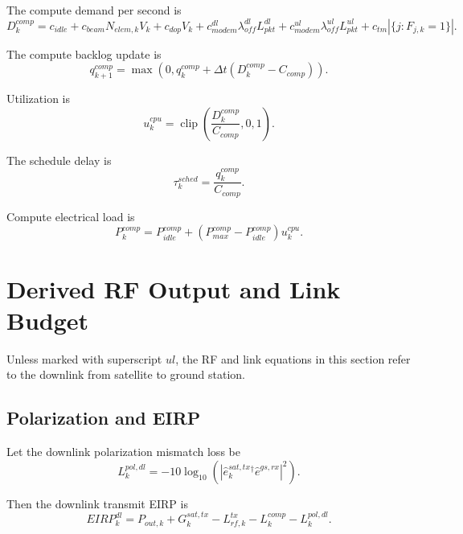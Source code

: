 \documentclass[11pt]{article}
\newcommand{\clip}{\operatorname{clip}}
\begin{document}
The compute demand per second is
\begin{equation}
  D^{comp}_k
  =
  c_{idle}
  + c_{beam}N_{elem,k}V_k
  + c_{dop}V_k
  + c^{dl}_{modem}\lambda^{dl}_{off}L^{dl}_{pkt}
  + c^{ul}_{modem}\lambda^{ul}_{off}L^{ul}_{pkt}
  + c_{tm}|\{j : F_{j,k}=1\}|.
\end{equation}

The compute backlog update is
\begin{equation}
  q^{comp}_{k+1}
  =
  \max\left(0, q^{comp}_k + \Delta t(D^{comp}_k - C_{comp})\right).
\end{equation}

Utilization is
\begin{equation}
  u^{cpu}_k = \clip\left( \frac{D^{comp}_k}{C_{comp}}, 0, 1 \right).
\end{equation}

The schedule delay is
\begin{equation}
  \tau^{sched}_k = \frac{q^{comp}_k}{C_{comp}}.
\end{equation}

Compute electrical load is
\begin{equation}
  P^{comp}_k = P^{comp}_{idle} + (P^{comp}_{max} - P^{comp}_{idle})u^{cpu}_k.
\end{equation}

\section{Derived RF Output and Link Budget}

Unless marked with superscript $ul$, the RF and link equations in this section refer
to the downlink from satellite to ground station.

\subsection{Polarization and EIRP}

Let the downlink polarization mismatch loss be
\begin{equation}
  L^{pol,dl}_k
  =
  -10 \log_{10}\left(
    \left| \hat{e}^{sat,tx}_k{}^\dagger \hat{e}^{gs,rx} \right|^2
  \right).
\end{equation}

Then the downlink transmit EIRP is
\begin{equation}
  EIRP^{dl}_k
  =
  P_{out,k}
  + G^{sat,tx}_k
  - L^{tx}_{rf,k}
  - L^{comp}_k
  - L^{pol,dl}_k.
\end{equation}
\end{document}
